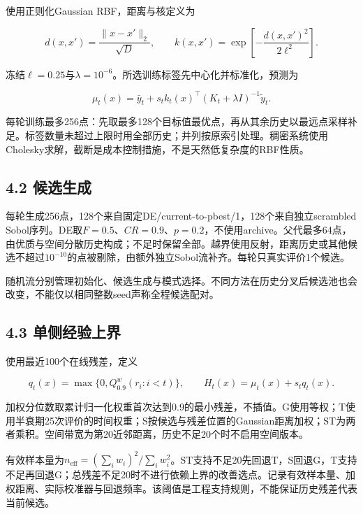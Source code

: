 \documentclass[11pt,a4paper]{article}
\begin{document}
使用正则化Gaussian RBF，距离与核定义为

\[
d(x,x')=\frac{\|x-x'\|_2}{\sqrt D},\qquad k(x,x')=\exp\left[-\frac{d(x,x')^2}{2\ell^2}\right].
\]

冻结\(\ell=0.25\)与\(\lambda=10^{-6}\)。所选训练标签先中心化并标准化，预测为

\[
\mu_t(x)=\bar y_t+s_t k_t(x)^\top(K_t+\lambda I)^{-1}\widetilde y_t.
\]

每轮训练最多256点：先取最多128个目标值最优点，再从其余历史以最远点采样补足。标签数量未超过上限时用全部历史；并列按原索引处理。稠密系统使用Cholesky求解，截断是成本控制措施，不是天然低复杂度的RBF性质。

\hypertarget{ux5019ux9009ux751fux6210}{%
\subsection{4.2 候选生成}\label{ux5019ux9009ux751fux6210}}

每轮生成256点，128个来自固定DE/current-to-pbest/1，128个来自独立scrambled
Sobol序列。DE取\(F=0.5\)、\(CR=0.9\)、\(p=0.2\)，不使用archive。父代最多64点，由优质与空间分散历史构成；不足时保留全部。越界使用反射，距离历史或其他候选不超过\(10^{-10}\)的点被剔除，由额外独立Sobol流补齐。每轮只真实评价1个候选。

随机流分别管理初始化、候选生成与模式选择。不同方法在历史分叉后候选池也会改变，不能仅以相同整数seed声称全程候选配对。

\begin{samepage}

\hypertarget{ux5355ux4fa7ux7ecfux9a8cux4e0aux754c}{%
\subsection{4.3
单侧经验上界}\label{ux5355ux4fa7ux7ecfux9a8cux4e0aux754c}}

使用最近100个在线残差，定义

\[
q_t(x)=\max\{0,Q^w_{0.9}(r_i:i<t)\},\qquad H_t(x)=\mu_t(x)+s_tq_t(x).
\]

\end{samepage}

加权分位数取累计归一化权重首次达到0.9的最小残差，不插值。G使用等权；T使用半衰期25次评价的时间权重；S按候选与残差位置的Gaussian距离加权；ST为两者乘积。空间带宽为第20近邻距离，历史不足20个时不启用空间版本。

有效样本量为\(n_{\mathrm{eff}}=(\sum_i w_i)^2/\sum_i w_i^2\)。ST支持不足20先回退T，S回退G，T支持不足再回退G；总残差不足20时不进行依赖上界的改善选点。记录有效样本量、加权距离、实际校准器与回退频率。该阈值是工程支持规则，不能保证历史残差代表当前候选。
\end{document}
